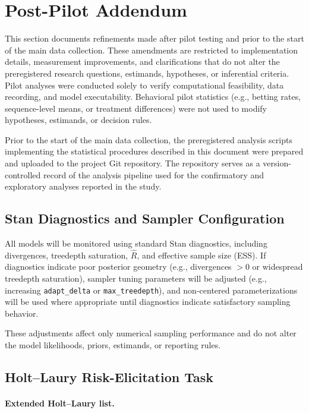 \documentclass[11pt,a4paper]{article}
\numberwithin{equation}{section}
\begin{document}
\clearpage
\section{Post-Pilot Addendum}
\label{App:PostPilotAddendum}

This section documents refinements made after pilot testing and prior to the
start of the main data collection. These amendments are restricted to
implementation details, measurement improvements, and clarifications that
do not alter the preregistered research questions, estimands, hypotheses,
or inferential criteria. Pilot analyses were conducted solely to verify
computational feasibility, data recording, and model executability.
Behavioral pilot statistics (e.g., betting rates, sequence-level means,
or treatment differences) were not used to modify hypotheses, estimands,
or decision rules.

Prior to the start of the main data collection, the preregistered analysis
scripts implementing the statistical procedures described in this document
were prepared and uploaded to the project Git repository. The repository
serves as a version-controlled record of the analysis pipeline used for
the confirmatory and exploratory analyses reported in the study.

\subsection{Stan Diagnostics and Sampler Configuration}

All models will be monitored using standard Stan diagnostics,
including divergences, treedepth saturation, $\hat{R}$, and effective
sample size (ESS). If diagnostics indicate poor posterior geometry
(e.g., divergences $>0$ or widespread treedepth saturation),
sampler tuning parameters will be adjusted (e.g., increasing
\texttt{adapt\_delta} or \texttt{max\_treedepth}), and non-centered
parameterizations will be used where appropriate until diagnostics
indicate satisfactory sampling behavior.

These adjustments affect only numerical sampling performance and do
not alter the model likelihoods, priors, estimands, or reporting rules.

\subsection{Holt--Laury Risk-Elicitation Task}

\paragraph{Extended Holt--Laury list.}
\end{document}

